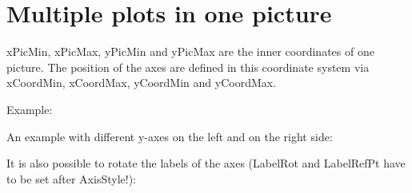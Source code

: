 %
%
%
%


\section{Multiple plots in one picture}\label{sec:MultiplePlots}

xPicMin, xPicMax, yPicMin and yPicMax are the inner coordinates of one picture.
The position of the axes are defined in this coordinate system via xCoordMin,
xCoordMax, yCoordMin and yCoordMax.

Example:







An example with different y-axes on the left and on the right side:






It is also possible to rotate the labels of the axes (LabelRot and LabelRefPt
have to be set after AxisStyle!):




